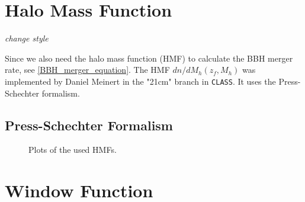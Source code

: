 \section{Halo Mass Function}

\textit{change style}

Since we also need the halo mass function (HMF) to calculate the BBH merger rate, 
see \ref{BBH_merger_equation}. The HMF $dn/dM_h (z_f, M_h)$ was implemented by Daniel Meinert in the "21cm" branch in {\tt CLASS}. It uses the Press-Schechter formalism.

\subsection{Press-Schechter Formalism}

\begin{figure}[h]
    \centering
    \caption{Plots of the used HMFs.}
    \label{HMF_plots}
\end{figure} 


\section{Window Function}
\label{window_fct_section}

